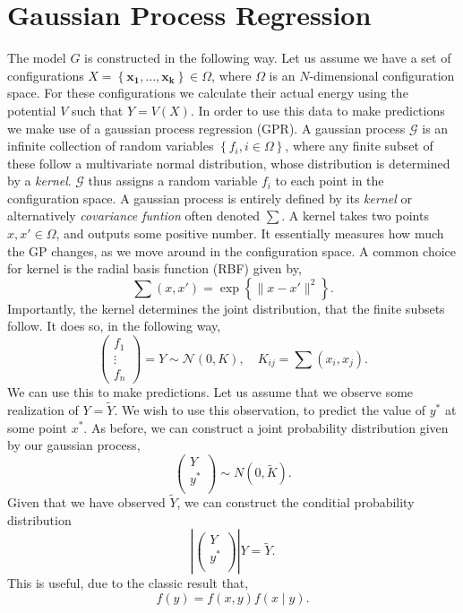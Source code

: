 \documentclass[working, oneside]{../../Preambles/tuftebook}
\begin{document}
\section*{Gaussian Process Regression}
The model $G$ is constructed in the following way. Let us assume we have a set of configurations $X = \left\{ \bm{x_1}, \ldots, \bm{x_k} \right\} \in \Omega$, where $\Omega$ is an $N$-dimensional configuration space. For these configurations we calculate their actual energy using the potential $V$ such that $Y = V(X)$.
In order to use this data to make predictions we make use of a gaussian process regression (GPR). A gaussian process $\mathcal{G}$ is an infinite collection of random variables $\left\{ f_i, i \in \Omega \right\} $, where any finite subset of these follow a multivariate normal distribution, whose distribution is determined by a \textit{kernel}. $\mathcal{G}$ thus assigns a random variable $f_i$ to each point in the configuration space. A gaussian process is entirely defined by its \textit{kernel} or alternatively \textit{covariance funtion} often denoted $\sum$. A kernel takes two points $x, x' \in \Omega$, and outputs some positive number. It essentially measures how much the GP changes, as we move around in the configuration space.  A common choice for kernel is the radial basis function (RBF) given by,
\[
\sum\left( x, x' \right) = \exp\left\{ \| x - x'\|^2 \right\} 
.\] 
Importantly, the kernel determines the joint distribution, that the finite subsets follow. It does so, in the following way,
\[
    \begin{pmatrix} f_1\\ \vdots\\ f_n \end{pmatrix} = Y \sim \mathcal{N}\left( 0, K \right) , \quad K_{ij} = \sum\left( x_i, x_j \right) 
.\] 
We can use this to make predictions. Let us assume that we observe some realization of $Y = \widetilde{Y}$. We wish to use this observation, to predict the value of $y^{*}$ at some point $x^{*}$. As before, we can construct a joint probability distribution given by our gaussian process,
\[
\begin{pmatrix}
    Y \\
    y^{*} \\
\end{pmatrix}
\sim N\left( 0, \widetilde{K} \right) 
.\] 
Given that we have observed $\widetilde{Y}$, we can construct the conditial probability distribution
 \[\left|
\begin{pmatrix}
    Y \\
    y^{*} \\
\end{pmatrix}
   \right| Y = \widetilde{Y}
.\] 
This is useful, due to the classic result that,
\[
f\left( y \right) = f\left( x,y \right) f\left( x \mid y \right) 
.\] 
\end{document}
